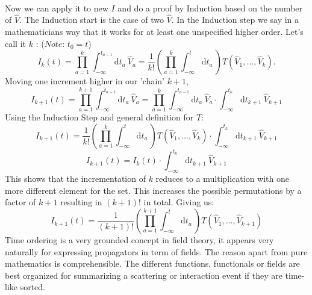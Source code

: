 \documentclass[12pt, titlepage]{article}
\begin{document}
\begin{subappendices}
\begin{subequations}
\end{subequations}
\\
Now we can apply it to new $ I $ and do a proof by Induction based on the number of $ \hat{V} $. The Induction start is the case of two $ \hat{V} $. In the Induction step we say in a mathematicians way that it works for at least one unspecified higher order. Let's call it $ k $ : ($ \textit{Note:} $ $ t_0 = t $)\\
\begin{equation}
I_k (t)
=
 \prod_{a=1}^{k} 
 \int_{-\infty}^{t_{a-1}}\mathrm{d}t_a\
  \hat{V}_a
=
\dfrac{1}{k!}
 (
 \prod_{a=1}^{k} 
\int_{-\infty}^{t}\mathrm{d}t_a\
)
T(\hat{V}_1,\ldots,\hat{V}_k).
\end{equation}
Moving one increment higher in our 'chain' $ k+1 $,
\\
\begin{equation}
I_{k+1} (t)
=
 \prod_{a=1}^{k+1} 
 \int_{-\infty}^{t_{a-1}}\mathrm{d}t_a\
  \hat{V}_a
  =
   \prod_{a=1}^{k} 
 \int_{-\infty}^{t_{a-1}}\mathrm{d}t_a\
  \hat{V}_a
  \cdot
 \int_{-\infty}^{t_{k}}\mathrm{d}t_{k+1}\
 \hat{V}_{k+1}
\end{equation}
Using the Induction Step and general definition for $ T $:
\\
\begin{equation}
I_{k+1} (t)
=
\dfrac{1}{k!}
 (
 \prod_{a=1}^{k} 
\int_{-\infty}^{t}\mathrm{d}t_a\
)
T(\hat{V}_1,\ldots,\hat{V}_k)
\cdot
 \int_{-\infty}^{t_{k}}\mathrm{d}t_{k+1}\
 \hat{V}_{k+1}
\end{equation}
\begin{equation}
I_{k+1} (t)
=
I_k (t)
\cdot
 \int_{-\infty}^{t_{k}}\mathrm{d}t_{k+1}\
 \hat{V}_{k+1}
\end{equation}
This shows that the incrementation of $ k $ reduces to a multiplication with one more different element for the set. This increases the possible permutations by a factor of $ k+1 $ resulting in $ (k+1)! $ in total. Giving us:
\begin{equation}
I_{k+1}(t)
=
\dfrac{1}{(k+1)!}
 (
 \prod_{a=1}^{k+1} 
\int_{-\infty}^{t}\mathrm{d}t_a\
)
T(\hat{V}_1,\ldots,\hat{V}_{k+1})
\end{equation}
Time ordering is a very grounded concept in field theory, it appears very naturally for expressing propagators in term of fields. The reason apart from pure mathematics is comprehensible. The different functions, functionals or fields are best organized for summarizing a scattering or interaction event if they are time-like sorted.
\\

\end{subappendices}
\end{document}
